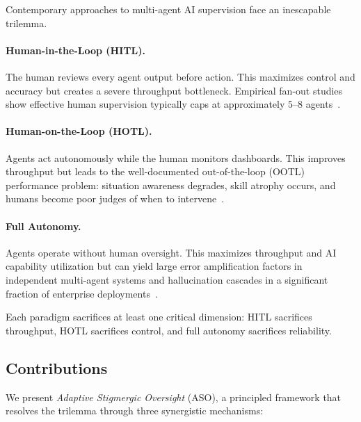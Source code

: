 \documentclass[11pt]{article}
\begin{document}
Contemporary approaches to multi-agent AI supervision face an inescapable trilemma.

\paragraph{Human-in-the-Loop (HITL).} The human reviews every agent output before action. This maximizes control and accuracy but creates a severe throughput bottleneck. Empirical fan-out studies show effective human supervision typically caps at approximately $5$--$8$ agents~\cite{olsen2004fan,perkins2024fanout}.

\paragraph{Human-on-the-Loop (HOTL).} Agents act autonomously while the human monitors dashboards. This improves throughput but leads to the well-documented out-of-the-loop (OOTL) performance problem: situation awareness degrades, skill atrophy occurs, and humans become poor judges of when to intervene~\cite{endsley1995toward,bainbridge1983ironies}.

\paragraph{Full Autonomy.} Agents operate without human oversight. This maximizes throughput and AI capability utilization but can yield large error amplification factors in independent multi-agent systems and hallucination cascades in a significant fraction of enterprise deployments~\cite{kim2026scaling}.

Each paradigm sacrifices at least one critical dimension: HITL sacrifices throughput, HOTL sacrifices control, and full autonomy sacrifices reliability.

\subsection{Contributions}

We present \emph{Adaptive Stigmergic Oversight} (ASO), a principled framework that resolves the trilemma through three synergistic mechanisms:
\end{document}
